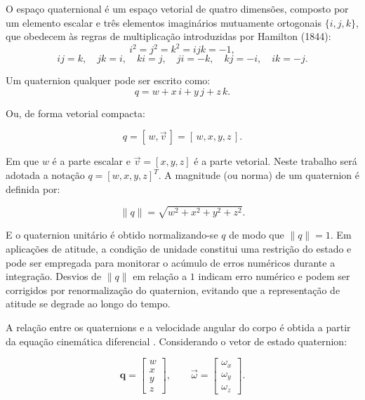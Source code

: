 O espaço quaternional é um espaço vetorial de quatro dimensões, composto por um elemento escalar e três elementos imaginários mutuamente ortogonais $\{i,j,k\}$, que obedecem às regras de multiplicação introduzidas por Hamilton (1844):
\begin{equation}
i^2 = j^2 = k^2 = ijk = -1,
\label{eq_hamilton_quadrados}
\end{equation}
\begin{equation}
ij = k,\quad jk = i,\quad ki = j,\quad
ji = -k,\quad kj = -i,\quad ik = -j.
\label{eq_hamilton_produtos}
\end{equation}

Um quaternion qualquer pode ser escrito como:
\begin{equation}
q = w + x\,i + y\,j + z\,k.
\label{eq_quaternion_forma}
\end{equation}

Ou, de forma vetorial compacta:

\begin{equation}
q = [\,w,\vec{v}\,] = [\,w,x,y,z\,].
\label{eq_quaternion_wxyz}
\end{equation}

Em que $w$ é a parte escalar e $\vec{v} = [x,y,z]$ é a parte vetorial.
Neste trabalho será adotada a notação $q = [w,x,y,z]^T$.
A magnitude (ou norma) de um quaternion é definida por:

\begin{equation}
\|q\| = \sqrt{w^2 + x^2 + y^2 + z^2}.
\label{eq_norma_quaternion}
\end{equation}

E o quaternion unitário é obtido normalizando-se $q$ de modo que $\|q\| = 1$.
Em aplicações de atitude, a condição de unidade constitui uma restrição do estado e pode ser empregada para monitorar o acúmulo de erros numéricos durante a integração.
Desvios de $\|q\|$ em relação a $1$ indicam erro numérico e podem ser corrigidos por renormalização do quaternion, evitando que a representação de atitude se degrade ao longo do tempo.

A relação entre os quaternions e a velocidade angular do corpo é obtida a partir da equação cinemática diferencial \cite{wie2008space}.
Considerando o vetor de estado quaternion:

\begin{equation}
\mathbf{q} =
\begin{bmatrix}
w \\
x \\
y \\
z
\end{bmatrix},
\qquad
\vec{\omega} =
\begin{bmatrix}
\omega_x \\ \omega_y \\ \omega_z
\end{bmatrix}.
\label{eq_q_omega_vetores}
\end{equation}

